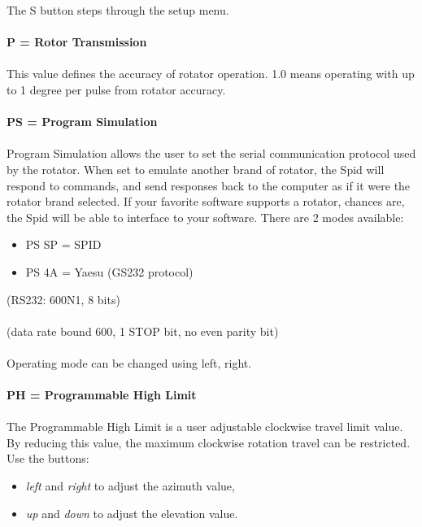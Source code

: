 \documentclass[11pt]{article} %
\begin{document}
The S button steps through the setup menu.
\\ \\
\textbf{P = Rotor Transmission}
\\ \\
This value defines the accuracy of rotator operation. 1.0 means operating with up to 1 degree per pulse from rotator accuracy.
\\ \\
\textbf{PS = Program Simulation}
\\ \\
Program Simulation allows the user to set the serial communication protocol used by the rotator. When set to emulate another brand of rotator, the Spid will respond to commands, and send responses back to the computer as if it were the rotator brand selected. If your favorite software supports a rotator, chances are, the Spid will be able to interface to your software. There are 2 modes available:	
\begin{itemize}
\item PS SP = SPID
\item PS 4A = Yaesu (GS232 protocol)
\end{itemize}
(RS232: 600N1, 8 bits)
\\ \\
(data rate bound 600, 1 STOP bit, no even parity bit)
\\ \\
Operating mode can be changed using left, right.
\\ \\
\textbf{PH = Programmable High Limit}
\\ \\
The Programmable High Limit is a user adjustable clockwise travel limit value. By reducing this value, the maximum clockwise rotation travel can be restricted. Use the buttons:
\begin{itemize}
\item \emph{left} and \emph{right} to adjust the azimuth value,
\item \emph{up} and \emph{down} to adjust the elevation value.
\end{itemize}
\end{document}
